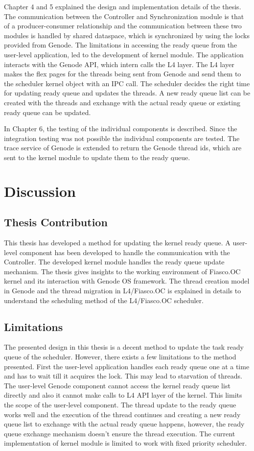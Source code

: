 Chapter 4 and 5 explained the design and implementation details of the thesis. The communication between the Controller and Synchronization module is that of a producer-consumer relationship and the communication between these two modules is handled by shared dataspace, which is synchronized by using the locks provided from Genode. The limitations in accessing the ready queue from the user-level application, led to the development of kernel module. The application interacts with the Genode API, which intern calls the L4 layer. The L4 layer makes the flex pages for the threads being sent from Genode and send them to the scheduler kernel object with an IPC call. The scheduler decides the right time for updating ready queue and updates the threads. A new ready queue list can be created with the threads and exchange with the actual ready queue or existing ready queue can be updated.

In Chapter 6, the testing of the individual components is described. Since the integration testing was not possible the individual components are tested. The trace service of Genode is extended to return the Genode thread ids, which are sent to the kernel module to update them to the ready queue.

\section{Discussion} \label{disc}
\subsection{Thesis Contribution}
This thesis has developed a method for updating the kernel ready queue. A user-level component has been developed to handle the communication with the Controller. The developed kernel module handles the ready queue update mechanism. The thesis gives insights to the working environment of Fiasco.OC kernel and its interaction with Genode OS framework. The thread creation model in Genode and the thread migration in L4/Fiasco.OC is explained in details to understand the scheduling method of the L4/Fiasco.OC scheduler.

\subsection{Limitations}
The presented design in this thesis is a decent method to update the task ready queue of the scheduler. However, there exists a few limitations to the method presented. First the user-level application handles each ready queue one at a time and has to wait till it acquires the lock. This may lead to starvation of threads. The user-level Genode component cannot access the kernel ready queue list  directly and also it cannot make calls to L4 API layer of the kernel. This limits the scope of the user-level component. The thread update to the ready queue works well and the execution of the thread continues and creating a new ready queue list to exchange with the actual ready queue happens, however, the ready queue exchange mechanism doesn't ensure the thread execution. The current implementation of kernel module is limited to work with fixed priority scheduler.

